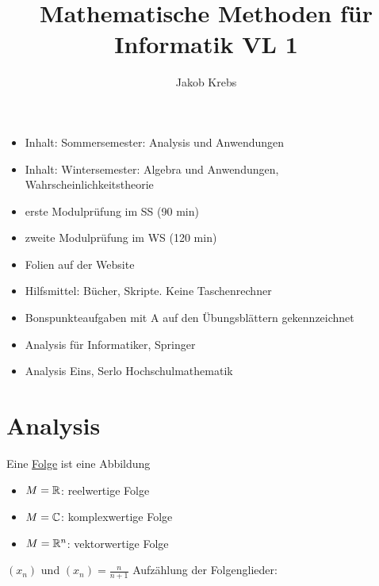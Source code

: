 \documentclass{../tudscript}
\title{Mathematische Methoden für Informatik VL 1}
\author{Jakob Krebs}
\begin{document}
    \begin{itemize}
        \item Inhalt: Sommersemester: Analysis und Anwendungen
        \item Inhalt: Wintersemester: Algebra und Anwendungen, Wahrscheinlichkeitstheorie
        \item erste Modulprüfung im SS (90 min)
        \item zweite Modulprüfung im WS (120 min)
        \item Folien auf der Website
        \item Hilfsmittel: Bücher, Skripte. Keine Taschenrechner
        \item Bonspunkteaufgaben mit A auf den Übungsblättern gekennzeichnet
    \end{itemize}
    \begin{itemize}
        \item Analysis für Informatiker, Springer
        \item Analysis Eins, Serlo Hochschulmathematik
    \end{itemize}
    
    \part{Analysis}
                Eine \underline{Folge} ist eine Abbildung
                \begin{itemize}
                    \item $M = \mathbb{R}$: reelwertige Folge
                    \item $M = \mathbb{C}$: komplexwertige Folge
                    \item $M = \mathbb{R}^n$: vektorwertige Folge
                \end{itemize}

                $(x_n)$ und $(x_n) = \frac{n}{n+1}$
                Aufzählung der Folgenglieder:
\end{document}
